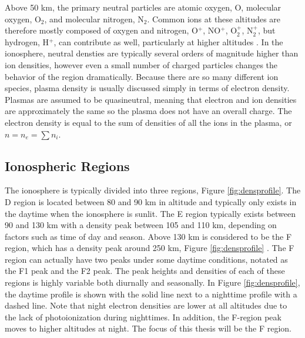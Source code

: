 Above 50 km, the primary neutral particles are atomic oxygen, O, molecular oxygen, O\(_2\), and molecular nitrogen, N\(_2\).  Common ions at these altitudes are therefore mostly composed of oxygen and nitrogen, O\(^+\), NO\(^+\), O\(_2^+\), N\(_2^+\), but hydrogen, H\(^+\), can contribute as well, particularly at higher altitudes \citep{Kelley2009}.  In the ionosphere, neutral densties are typically several orders of magnitude higher than ion densities, however even a small number of charged particles changes the behavior of the region dramatically.  Because there are so many different ion species, plasma density is usually discussed simply in terms of electron density.  Plasmas are assumed to be quasineutral, meaning that electron and ion densities are approximately the same so the plasma does not have an overall charge.  The electron density is equal to the sum of densities of all the ions in the plasma, or \(n = n_e = \sum n_i\).

\subsection{Ionospheric Regions}
\label{sec:ionosphere_regions}
The ionosphere is typically divided into three regions, Figure \ref{fig:densprofile}.  The D region is located between 80 and 90 km in altitude and typically only exists in the daytime when the ionosphere is sunlit.  The E region typically exists between 90 and 130 km with a density peak between 105 and 110 km, depending on factors such as time of day and season.  Above 130 km is considered to be the F region, which has a density peak around 250 km, Figure \ref{fig:densprofile} \citet{Luhmann1995}.  The F region can actually have two peaks under some daytime conditions, notated as the F1 peak and the F2 peak.  The peak heights and densities of each of these regions is highly variable both diurnally and seasonally.  In Figure \ref{fig:densprofile}, the daytime profile is shown with the solid line next to a nighttime profile with a dashed line.  Note that night electron densities are lower at all altitudes due to the lack of photoionization during nighttimes.  In addition, the F-region peak moves to higher altitudes at night.  The focus of this thesis will be the F region.

